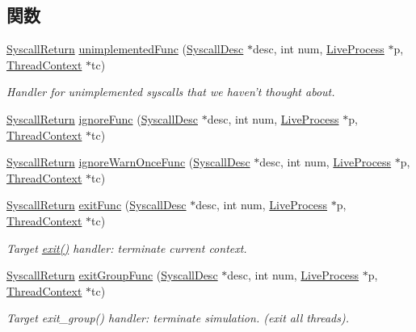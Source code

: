 \subsection*{関数}
\begin{DoxyCompactItemize}
\item 
\hyperlink{classSyscallReturn}{SyscallReturn} \hyperlink{syscall__emul_8hh_ac8f61c104c0b3ab72cee8268d0c5467e}{unimplementedFunc} (\hyperlink{classSyscallDesc}{SyscallDesc} $\ast$desc, int num, \hyperlink{classLiveProcess}{LiveProcess} $\ast$p, \hyperlink{classThreadContext}{ThreadContext} $\ast$tc)
\begin{DoxyCompactList}\small\item\em Handler for unimplemented syscalls that we haven't thought about. \item\end{DoxyCompactList}\item 
\hyperlink{classSyscallReturn}{SyscallReturn} \hyperlink{syscall__emul_8hh_a8f35ef9e245d5ed14d8080adec47f75e}{ignoreFunc} (\hyperlink{classSyscallDesc}{SyscallDesc} $\ast$desc, int num, \hyperlink{classLiveProcess}{LiveProcess} $\ast$p, \hyperlink{classThreadContext}{ThreadContext} $\ast$tc)
\item 
\hyperlink{classSyscallReturn}{SyscallReturn} \hyperlink{syscall__emul_8hh_a9e15ddc8451a50fcb56cb48592a56fe3}{ignoreWarnOnceFunc} (\hyperlink{classSyscallDesc}{SyscallDesc} $\ast$desc, int num, \hyperlink{classLiveProcess}{LiveProcess} $\ast$p, \hyperlink{classThreadContext}{ThreadContext} $\ast$tc)
\item 
\hyperlink{classSyscallReturn}{SyscallReturn} \hyperlink{syscall__emul_8hh_ae00a67f85c25cd1a9c5c0abcc037de4a}{exitFunc} (\hyperlink{classSyscallDesc}{SyscallDesc} $\ast$desc, int num, \hyperlink{classLiveProcess}{LiveProcess} $\ast$p, \hyperlink{classThreadContext}{ThreadContext} $\ast$tc)
\begin{DoxyCompactList}\small\item\em Target \hyperlink{namespaceX86ISA_aab9b5a2e1cd2f24d08a9872895ded9c9}{exit()} handler: terminate current context. \item\end{DoxyCompactList}\item 
\hyperlink{classSyscallReturn}{SyscallReturn} \hyperlink{syscall__emul_8hh_a6a0c80d27fdd5aeef1f76a1156c004e6}{exitGroupFunc} (\hyperlink{classSyscallDesc}{SyscallDesc} $\ast$desc, int num, \hyperlink{classLiveProcess}{LiveProcess} $\ast$p, \hyperlink{classThreadContext}{ThreadContext} $\ast$tc)
\begin{DoxyCompactList}\small\item\em Target exit\_\-group() handler: terminate simulation. (exit all threads). \item\end{DoxyCompactList}\item 

\end{DoxyCompactItemize}
